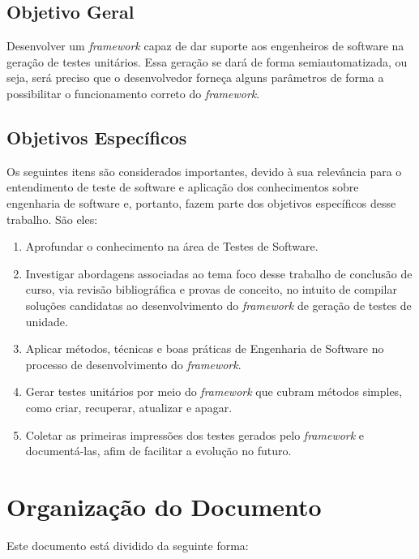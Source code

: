 \subsection{Objetivo Geral}
Desenvolver um \textit{framework} capaz de dar suporte aos engenheiros de
software na geração de testes unitários.  Essa geração se dará de forma
semiautomatizada, ou seja, será preciso que o desenvolvedor forneça alguns
parâmetros de forma a possibilitar o funcionamento correto do
\textit{framework}.

\subsection{Objetivos Específicos}
Os seguintes itens são considerados importantes, devido à sua relevância para o
entendimento de teste de software e aplicação dos conhecimentos sobre
engenharia de software e, portanto, fazem parte dos objetivos específicos desse
trabalho. São eles:
\begin{enumerate}
  \item Aprofundar o conhecimento na área de Testes de Software.

  \item Investigar abordagens associadas ao tema foco desse trabalho de
    conclusão de curso, via revisão bibliográfica e provas de conceito, no
    intuito de compilar soluções candidatas ao desenvolvimento do
    \textit{framework} de geração de testes de unidade.

  \item Aplicar métodos, técnicas e boas práticas de Engenharia de Software
    no processo de desenvolvimento do \textit{framework}.

  \item Gerar testes unitários por meio do \textit{framework} que cubram
    métodos simples, como criar, recuperar, atualizar e apagar.

  \item Coletar as primeiras impressões dos testes gerados pelo
    \textit{framework} e documentá-las, afim de facilitar a evolução no futuro.
\end{enumerate}

\section{Organização do Documento}
  Este documento está dividido da seguinte forma:

